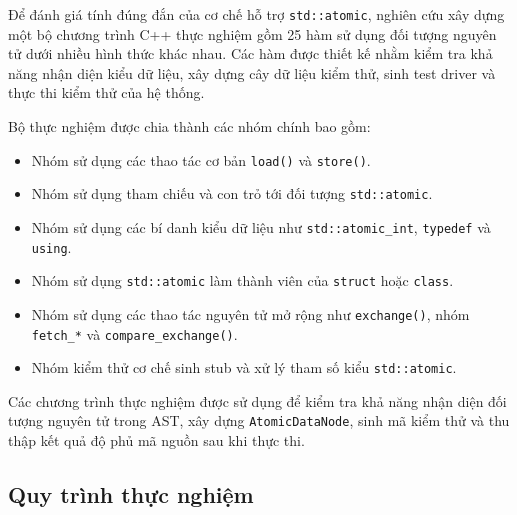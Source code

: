 Để đánh giá tính đúng đắn của cơ chế hỗ trợ \texttt{std::atomic}, nghiên cứu xây dựng một bộ chương trình C++ thực nghiệm gồm 25 hàm sử dụng đối tượng nguyên tử dưới nhiều hình thức khác nhau. Các hàm được thiết kế nhằm kiểm tra khả năng nhận diện kiểu dữ liệu, xây dựng cây dữ liệu kiểm thử, sinh test driver và thực thi kiểm thử của hệ thống.

Bộ thực nghiệm được chia thành các nhóm chính bao gồm:

\begin{itemize}
\item Nhóm sử dụng các thao tác cơ bản \texttt{load()} và \texttt{store()}.
\item Nhóm sử dụng tham chiếu và con trỏ tới đối tượng \texttt{std::atomic}.
\item Nhóm sử dụng các bí danh kiểu dữ liệu như \texttt{std::atomic\_int}, \texttt{typedef} và \texttt{using}.
\item Nhóm sử dụng \texttt{std::atomic} làm thành viên của \texttt{struct} hoặc \texttt{class}.
\item Nhóm sử dụng các thao tác nguyên tử mở rộng như \texttt{exchange()}, nhóm \nolinkurl{fetch_*} và \nolinkurl{compare_exchange()}.
\item Nhóm kiểm thử cơ chế sinh stub và xử lý tham số kiểu \texttt{std::atomic}.
\end{itemize}

Các chương trình thực nghiệm được sử dụng để kiểm tra khả năng nhận diện đối tượng nguyên tử trong AST, xây dựng \texttt{AtomicDataNode}, sinh mã kiểm thử và thu thập kết quả độ phủ mã nguồn sau khi thực thi.


\subsection{Quy trình thực nghiệm}

